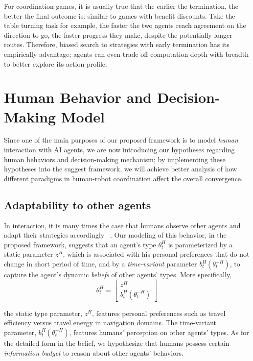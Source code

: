 \documentclass[letterpaper, 10 pt, conference]{ieeeconf}  %
\begin{document}
For coordination games, it is usually true that the earlier the termination, the better the final outcome is: similar to games with benefit discounts. Take the table turning task for example, the faster the two agents reach agreement on the direction to go, the faster progress they make, despite the potentially longer routes. Therefore, biased search to strategies with early termination has its empirically advantage; agents can even trade off computation depth with breadth to better explore its action profile. 

\section{Human Behavior and Decision-Making Model}\label{sec:human_behavior}
Since one of the main purposes of our proposed framework is to model \textit{human} interaction with AI agents, we are now introducing our hypotheses regarding human behaviors and decision-making mechanism; by implementing these hypotheses into the suggest framework, we will achieve better analysis of how different paradigms in human-robot coordination affect the overall convergence.

\vspace{-.2em}
\subsection{Adaptability to other agents}\label{sec:adaptability}
\vspace{-.2em}
In interaction, it is many times the case that humans observe other agents and adapt their strategies accordingly ~\cite{nikolaidis2016formalizing,yang2017evaluating}. Our modeling of this behavior, in the proposed framework, suggests that an agent's type $\theta^H_t$ is parameterized by a static parameter $z^H$, which is associated with his personal preferences that do not change in short period of time, and by a \textit{time-variant} parameter $b^H_t(\theta^{-H}_t)$, to capture the agent's dynamic \textit{beliefs} of other agents' types. More specifically,
\begin{equation}
  \theta^H_t = \begin{bmatrix}
    z^H \\
    b^H_t(\theta^{-H}_t)
  \end{bmatrix}
\end{equation}

the static type parameter, $z^H$, features personal preferences such as travel efficiency versus travel energy in navigation domains. The time-variant parameter, $b^H_t(\theta^{-H}_t)$, features humans' perception on other agents' types. As for the detailed form in the belief, we hypothesize that humans possess certain \textit{information budget} to reason about other agents' behaviors.
\end{document}
